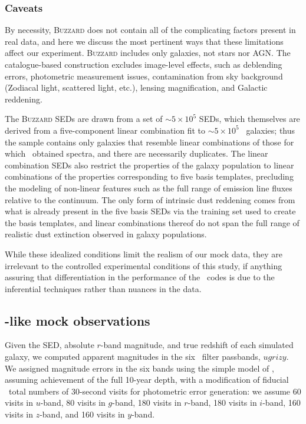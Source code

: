 \subsubsection{Caveats}
\label{sec:buzzlimitations}

By necessity, \textsc{Buzzard} does not contain all of the complicating factors present in real data, and here we discuss the most pertinent ways that these limitations affect our experiment.
\textsc{Buzzard} includes only galaxies, not stars nor AGN.
The catalogue-based construction excludes image-level effects, such as deblending errors, photometric measurement issues, contamination from sky background (Zodiacal light, scattered light, etc.), lensing magnification, and Galactic reddening.

The \textsc{Buzzard} SEDs are drawn from a set of $\sim 5 \times 10^{5}$ SEDs, which themselves are derived from a five-component linear combination fit to $\sim 5 \times 10^{5}$ \sdss\ galaxies; thus the sample contains only galaxies that resemble linear combinations of those for which \sdss\ obtained spectra, and there are necessarily duplicates.
The linear combination SEDs also restrict the properties of the galaxy population to linear combinations of the properties corresponding to five basis templates, precluding the modeling of non-linear features such as the full range of emission line fluxes relative to the continuum.
The only form of intrinsic dust reddening comes from what is already present in the five basis SEDs via the training set used to create the basis templates, and linear combinations thereof do not span the full range of realistic dust extinction observed in galaxy populations.

While these idealized conditions limit the realism of our mock data, they are irrelevant to the controlled experimental conditions of this study, if anything assuring that differentiation in the performance of the \pzpdf\ codes is due to the inferential techniques rather than nuances in the data.

\subsection{\lsst-like mock observations}
\label{sec:observations}

Given the SED, absolute $r$-band magnitude, and true redshift of each simulated galaxy, we computed apparent magnitudes in the six \lsst\ filter passbands, $ugrizy$.
We assigned magnitude errors in the six bands using the simple model of \citet{Ivezic:08}, assuming achievement of the full 10-year depth, with a modification of fiducial \lsst\ total numbers of 30-second visits for photometric error generation: we assume 60 visits in $u$-band, 80 visits in $g$-band, 180 visits in $r$-band, 180 visits in $i$-band, 160 visits in $z$-band, and 160 visits in $y$-band.

